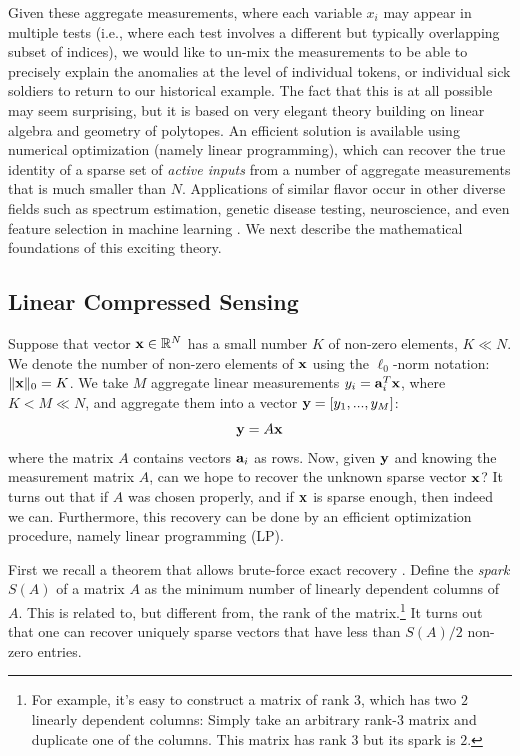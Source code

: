 Given these aggregate measurements, where each variable $x_i$ may appear in multiple tests
(i.e., where each test involves a different but typically overlapping subset of indices), we would like to un-mix the
measurements to be able to precisely explain the anomalies at the level of individual tokens,
or individual sick soldiers to return to our historical example.  The fact that this is at all possible may seem surprising, but it
is based on very elegant theory building on linear algebra and geometry of polytopes.  An
efficient solution is available using numerical optimization (namely linear programming), which
can recover the true identity of a sparse set of {\em active inputs} from a number of aggregate
measurements that is much smaller than $N$. Applications of similar flavor occur in
other diverse fields such as spectrum estimation, genetic disease testing, neuroscience, and even feature selection in machine learning \cite{rish2014sparse}. We next describe the mathematical foundations of this exciting theory.

\subsection{Linear Compressed Sensing}

Suppose that  vector $\mathbf{x} \in \mathbb{R}^N$ has a small number $K$ of non-zero elements, $K \ll N$.
We denote the number of non-zero elements of $\mathbf{x}$ using the $\ell_0$-norm notation:
$\Vert \mathbf{x} \Vert_0 = K$.   We take $M$ aggregate linear measurements $y_i = \mathbf{a}_i^T \mathbf{x}$, where
$K < M \ll N$, and aggregate them into a vector $\mathbf{y} = [y_1, ..., y_M]$:
\begin{equation}
\mathbf{y} = A \mathbf{x}
\end{equation}
where the matrix $A$ contains vectors $\mathbf{a}_i$ as rows. Now, given $\mathbf{y}$ and knowing the
measurement matrix $A$, can we hope to recover the unknown
sparse vector $\mathbf{x}$?  It turns out that if $A$ was chosen properly, and if $\mathbf{x}$ is sparse
enough, then indeed we can. Furthermore, this recovery can be done by an efficient optimization
procedure, namely linear programming (LP).

First we recall a theorem that allows brute-force exact recovery \cite{donoho_pnas}. Define the {\em spark}
$S(A)$ of a matrix $A$ as the minimum number of linearly dependent columns of $A$. This is related to,
but different from, the rank of the matrix.\footnote{For example, it's easy to construct a matrix of rank
$3$, which has two $2$ linearly dependent columns: Simply take an arbitrary rank-$3$ matrix and
duplicate one of the columns. This matrix has rank $3$ but its spark is $2$.} It turns out that
one can recover uniquely sparse vectors that have less than $S(A) / 2$ non-zero entries.

